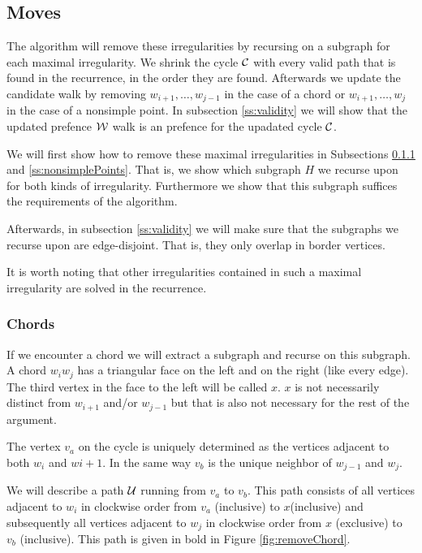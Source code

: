 \subsection{Moves}
\newcommand{\U}{\scr U}
The algorithm will remove these irregularities by recursing on a subgraph for each maximal irregularity. We shrink the cycle $\mathcal{C}$ with every valid path that is found in the recurrence, in the order they are found. Afterwards we update the candidate walk by removing $w_{i+1}, \ldots, w_{j-1}$ in the case of a chord or $w_{i+1}, \ldots, w_{j}$ in the case of a nonsimple point. In subsection \ref{ss:validity} we will show that the updated prefence $\mathcal{W}$ walk is an prefence for the upadated cycle $\mathcal{C}$.


We will first show how to remove these maximal irregularities in Subsections \ref{ss:chords} and \ref{ss:nonsimplePoints}. That is, we show which subgraph $H$ we recurse upon for both kinds of irregularity. Furthermore we show that this subgraph suffices the requirements of the algorithm.

Afterwards, in subsection \ref{ss:validity} we will make sure that the subgraphs we recurse upon are edge-disjoint. That is, they only overlap in border vertices.

It is worth noting that other irregularities contained in such a maximal irregularity are solved in the recurrence.

\subsubsection{Chords}
\label{ss:chords}
If we encounter a chord we will extract a subgraph and recurse on this subgraph. A chord $w_iw_j$ has a triangular face on the left and on the right (like every edge). The third vertex in the face to the left will be called $x$. $x$ is not necessarily distinct from $w_{i+1}$ and/or $w_{j-1}$ but that is also not necessary for the rest of the argument. 

The vertex $v_a$ on the cycle is uniquely determined as the vertices adjacent to both $w_i$ and $w{i+1}$. In the same way $v_b$ is the unique neighbor of $w_{j-1}$ and $w_j$.

We will describe a path $\mathcal{U}$ running from $v_a$ to $v_b$. This path consists of all vertices adjacent to $w_i$ in clockwise order from $v_a$ (inclusive) to $x$(inclusive) and subsequently all vertices adjacent to $w_j$ in clockwise order from $x$ (exclusive) to $v_b$ (inclusive). This path is given in bold in Figure \ref{fig:removeChord}.

